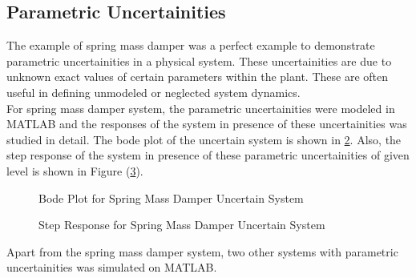 \documentclass[a4paper,12pt]{article}
\begin{document}
					\begin{figure}[H]
\centering
\begin{minipage}{0.6\textwidth}
  \centering
%  
 \def\svgscale{0.5}
			  \tiny{
			  }
  \label{ti}
\end{minipage}%
\begin{minipage}{0.6\textwidth}
  \centering
%  
 \def\svgscale{0.5}
			  \tiny{
			  }
  \label{to}
\end{minipage}
\end{figure}
			\subsection{Parametric Uncertainities} The example of spring mass damper was a perfect example to demonstrate parametric uncertainities in a physical system. These uncertainities are due to unknown exact values of certain parameters within the plant. These are often useful in defining unmodeled or neglected system dynamics. \\
			For spring mass damper system, the parametric uncertainities were modeled in MATLAB and the responses of the system in presence of these uncertainities was studied in detail. The bode plot of the uncertain system is shown in \ref{bode_smd}. Also, the step response of the system in presence of these parametric uncertainities of given level is shown in Figure (\ref{step_smd}).
			
				\begin{figure}[H]
 
			  \centering
			  
			  
			  \caption{Bode Plot for Spring Mass Damper Uncertain System}
			 \label{bode_smd}
		\end{figure}	
			
			
				\begin{figure}[H]
 
			  \centering
			  
			  
			  \caption{Step Response for Spring Mass Damper Uncertain System}
			 \label{step_smd}
		\end{figure}	
			 Apart from the spring mass damper system, two other systems with parametric uncertainities was simulated on MATLAB. 
\end{document}
